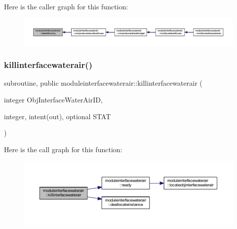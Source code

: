 Here is the caller graph for this function\+:\nopagebreak
\begin{figure}[H]
\begin{center}
\leavevmode
\includegraphics[width=350pt]{namespacemoduleinterfacewaterair_ab0d1bf1d73b112083b7be11d6c22aebc_icgraph}
\end{center}
\end{figure}
\mbox{\label{namespacemoduleinterfacewaterair_a9492d98237c53dd77ad30ffe270b64cd}} 
\subsubsection{\texorpdfstring{killinterfacewaterair()}{killinterfacewaterair()}}
{\footnotesize\ttfamily subroutine, public moduleinterfacewaterair\+::killinterfacewaterair (\begin{DoxyParamCaption}\item[{integer}]{Obj\+Interface\+Water\+Air\+ID,  }\item[{integer, intent(out), optional}]{S\+T\+AT }\end{DoxyParamCaption})}

Here is the call graph for this function\+:\nopagebreak
\begin{figure}[H]
\begin{center}
\leavevmode
\includegraphics[width=350pt]{namespacemoduleinterfacewaterair_a9492d98237c53dd77ad30ffe270b64cd_cgraph}
\end{center}
\end{figure}
\mbox{\label{namespacemoduleinterfacewaterair_a17c41a363434acdb52729214d81e9e86}} 
